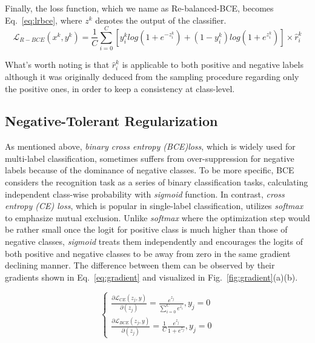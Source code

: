 \documentclass[runningheads]{llncs}
\begin{document}
Finally, the loss function, which we name as Re-balanced-BCE, becomes Eq.~\ref{eq:lrbce}, where $z^k$ denotes the output of the classifier.
\begin{equation}
\mathcal{L}_{R-BCE}(x^k, y^k) = \frac{1}{C}\sum_{i=0}^C{ \left[ y^k_i log(1 + e^{-z^k_i}) + (1 - y^k_i)log(1 + e^{z^k_i})\right] \times \hat{r}^k_i}
\label{eq:lrbce}
\end{equation}

What's worth noting is that $\hat{r}^k_i$ is applicable to both positive and negative labels although it was originally deduced from the sampling procedure regarding only the positive ones, 
in order to keep a consistency at class-level.

\subsection{Negative-Tolerant Regularization}
\label{subsec:regularization}

As mentioned above, \textit{binary cross entropy (BCE)loss}, which is widely used for multi-label classification,
sometimes suffers from over-suppression for negative labels because of the dominance of negative classes. 
To be more specific, BCE considers the recognition task as a series of binary classification tasks, calculating independent class-wise probability with \textit{sigmoid} function.
In contrast, \textit{cross entropy (CE) loss}, which is popular in single-label classification, utilizes \textit{softmax} to emphasize mutual exclusion.
Unlike \textit{softmax} where the optimization step would be rather small once the logit for positive class is much higher than those of negative classes, \textit{sigmoid} treats them independently and encourages the logits of both positive and negative classes to be away from zero in the same gradient declining manner. The difference between them can be observed by their gradients shown in Eq.~\ref{eq:gradient} and visualized in Fig.~\ref{fig:gradient}(a)(b).

\begin{equation}
    \left\{
    \begin{aligned}
    \frac{\partial{\mathcal{L}_{CE}(z_j, y)}}{\partial{(z_j)}} = \frac{e^{z_j}}{\sum_{i=0}^Ce^{z_i}}, y_j=0 \\
    \frac{\partial{\mathcal{L}_{BCE}(z_j, y)}}{\partial{(z_j)}} = \frac{1}{C}\frac{e^{z_j}}{1+e^{z_j}}, y_j=0
    \end{aligned}
    \right.
    \label{eq:gradient}
\end{equation}
\end{document}
